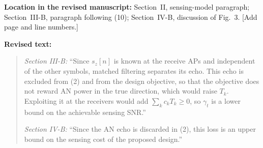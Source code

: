 \documentclass[a4paper,12pt]{article}
\newcommand{\revisionlocation}[1]{\par\textbf{Location in the revised manuscript:} #1\par}
\newenvironment{revisedtext}{%
  \par\textbf{Revised text:}\begin{quote}\color{red}
}{\end{quote}}
\begin{document}
\revisionlocation{Section~II, sensing-model paragraph; Section~III-B,
paragraph following (10); Section~IV-B, discussion of Fig.~3. [Add page and
line numbers.]}
\begin{revisedtext}
\textit{Section III-B:} ``Since $s_z[n]$ is known at the receive APs and
independent of the other symbols, matched filtering separates its echo. This
echo is excluded from (2) and from the design objective, so that the
objective does not reward AN power in the true direction, which would raise
$T_k$. Exploiting it at the receivers would add $\sum_kc_kT_k\ge0$, so
$\gamma_t$ is a lower bound on the achievable sensing SNR.''

\textit{Section IV-B:} ``Since the AN echo is discarded in (2), this loss is
an upper bound on the sensing cost of the proposed design.''
\end{revisedtext}
\end{document}
